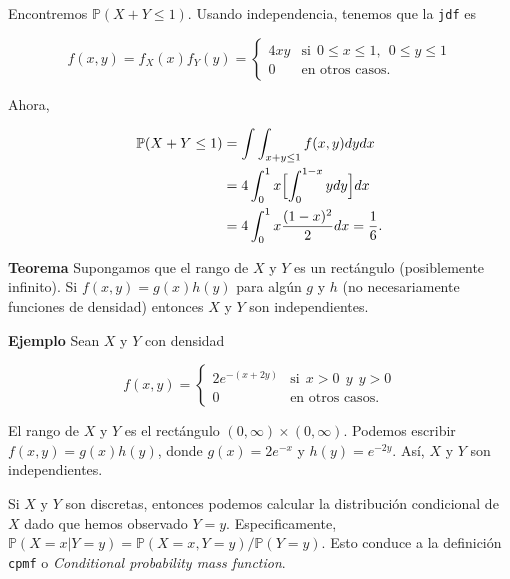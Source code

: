 \documentclass{article}\usepackage[]{graphicx}\usepackage[]{color}
\begin{document}
\vspace{0.2cm}

Encontremos $\mathbb{P}(X + Y \leq 1)$. Usando independencia, tenemos que  la \texttt{jdf} es

\[
f(x,y) = f_{X}(x)f_{Y}(y) = \begin{cases}
4xy & \mbox{si}\ \  0 \leq x \leq 1,\ \ 0 \leq y \leq 1\\
0 & \mbox{en otros casos}.
\end{cases}
\]

\vspace{0.5cm}

Ahora,

\vspace{0.3cm}

\begin{align*}
\mathbb{P}(X +  Y \leq 1) &= \int \int_{x + y \leq 1}f(x,y)dydx \\
&= 4\int_{0}^{1}x\Bigl[\int_{0}^{1-x}ydy \Bigr]dx \\
&=4 \int_{0}^{1}x\frac{(1 - x)^2}{2}dx = \frac{1}{6}.
\end{align*}

\vspace{0.3cm}

\textbf{Teorema}  Supongamos que el rango de $X$ y $Y$ es un rect\'angulo (posiblemente infinito). Si $f(x,y) = g(x)h(y)$ para alg\'un $g$ y $h$ (no necesariamente funciones de densidad) entonces $X$ y $Y$ son independientes.

\vspace{0.3cm}

\textbf{Ejemplo} Sean $X$ y $Y$ con densidad

\[
f(x,y) =\begin{cases}
2e^{-(x + 2y)} & \mbox{si} \ \ x > 0 \ \ y \ \ y > 0\\
0 & \mbox{en otros casos}.
\end{cases}
\]

\vspace{0.3cm}

El rango de $X$ y $Y$ es el rect\'angulo $(0, \infty) \times (0, \infty)$. Podemos escribir $f(x, y) = g(x)h(y)$, donde $g(x) = 2e^{-x}$ y $h(y) = e^{-2y}$. As\'i, $X$ y $Y$ son independientes.

\vspace{0.8cm}


Si $X$ y $Y$ son discretas, entonces podemos calcular la distribuci\'on condicional de $X$ dado que hemos observado $Y = y$. Especificamente, $\mathbb{P}(X =x| Y=y) = \mathbb{P}(X = x,Y=y)/\mathbb{P}(Y=y)$. Esto conduce a la definici\'on \texttt{cpmf} o \textit{Conditional probability mass function}.
\end{document}
